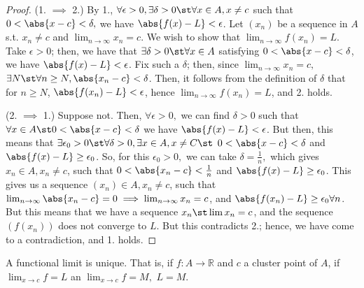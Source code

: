 \documentclass[12pt]{article}
\begin{document}
\begin{proof}
  (1. $\implies$ 2.) By 1., $\forall \epsilon > 0, \exists \delta > 0 \st \forall x \in A, x \neq c$ such that $0 < \abs{x - c} < \delta,$ we have $\abs{f(x) - L} < \epsilon$. Let $(x_n)$ be a sequence in $A$ s.t. $x_n \neq c$ and $\lim_{n\to\infty} x_n = c$. We wish to show that $\lim_{n\to\infty} f(x_n) = L$. Take $\epsilon > 0$; then, we have that $\exists \delta > 0 \st \forall x \in A$ satisfying $0 <\abs{x - c} < \delta$, we have $\abs{f(x) - L} < \epsilon$. Fix such a $\delta$; then, since $\lim_{n\to\infty} x_n = c,$ $\exists N \st \forall n \geq N, \abs{x_{n} - c} < \delta$. Then, it follows from the definition of $\delta$ that for $n \geq N$, $\abs{f(x_n) - L} < \epsilon$, hence $\lim_{n\to\infty} f(x_n) = L$, and 2. holds.

  (2. $\implies$ 1.) Suppose not. Then, $\forall \epsilon > 0,$ we can find $\delta > 0$ such that $\forall x \in A \st 0 < \abs{x - c} < \delta$ we have $\abs{f(x) - L} < \epsilon$. But then, this means that $\exists \epsilon_0 > 0 \st \forall \delta > 0, \exists x \in A, x \neq C \st$ $0 < \abs{x - c} < \delta$ and $\abs{f(x) - L} \geq \epsilon_0$. So, for this $\epsilon_0 >0,$ we can take $\delta = \frac{1}{n},$ which gives $x_n \in A, x_n \neq c$, such that $0 < \abs{x_n - c} < \frac{1}{n}$ and $\abs{f(x) - L} \geq \epsilon_0$. This gives us a sequence $(x_n) \in A, x_n \neq c$, such that $\lim_{n\to\infty} \abs{x_n - c} = 0 \implies \lim_{n\to\infty} x_n = c$,  and $\abs{f(x_n) - L} \geq \epsilon_0 \forall n$. But this means that we have a sequence $x_n \st \lim x_{n} = c$, and the sequence $(f(x_n))$ does not converge to $L$. But this contradicts 2.; hence, we have come to a contradiction, and 1. holds.
\end{proof}

\begin{proposition}
  A functional limit is unique. That is, if $f : A \to \mathbb{R}$ and $c$ a cluster point of $A$, if $\lim_{x\to c} f = L$ an $\lim_{x\to c} f = M,$ $L = M$.
\end{proposition}
\end{document}
